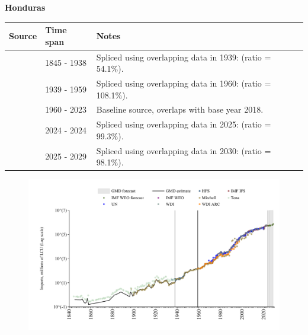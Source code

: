 \documentclass[12pt,a4paper,landscape]{article}
\begin{document}
\begin{adjustbox}{max totalsize={\paperwidth}{\paperheight},center}
\begin{minipage}[t][\textheight][t]{\textwidth}
\vspace*{0.5cm}
{}
\begin{center}
{\Large\bfseries Honduras}
\end{center}
\vspace{0.5cm}
\begin{table}[H]
\centering
\small
\begin{tabular}{|l|l|l|}
\hline
\textbf{Source} & \textbf{Time span} & \textbf{Notes} \\
\hline
\rowcolor{white}\cite{Tena}& 1845 - 1938 &Spliced using overlapping data in 1939: (ratio = 54.1\%).\\
\rowcolor{lightgray}\cite{Mitchell}& 1939 - 1959 &Spliced using overlapping data in 1960: (ratio = 108.1\%).\\
\rowcolor{white}\cite{WDI}& 1960 - 2023 &Baseline source, overlaps with base year 2018.\\
\rowcolor{lightgray}\cite{IMF_IFS}& 2024 - 2024 &Spliced using overlapping data in 2025: (ratio = 99.3\%).\\
\rowcolor{white}\cite{IMF_WEO_forecast}& 2025 - 2029 &Spliced using overlapping data in 2030: (ratio = 98.1\%).\\
\hline
\end{tabular}
\end{table}
\begin{figure}[H]
\centering
\includegraphics[width=\textwidth,height=0.6\textheight,keepaspectratio]{graphs/HND_imports.pdf}
\end{figure}
\end{minipage}
\end{adjustbox}
\end{document}
